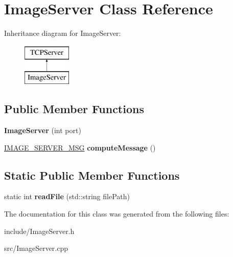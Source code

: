 \hypertarget{classImageServer}{\section{Image\-Server Class Reference}
\label{classImageServer}
}
Inheritance diagram for Image\-Server\-:\begin{figure}[H]
\begin{center}
\leavevmode
\includegraphics[height=2.000000cm]{classImageServer}
\end{center}
\end{figure}
\subsection*{Public Member Functions}
\begin{DoxyCompactItemize}
\item 
\hypertarget{classImageServer_a4b824c5337974577e55c68c3443939c6}{{\bfseries Image\-Server} (int port)}\label{classImageServer_a4b824c5337974577e55c68c3443939c6}

\item 
\hypertarget{classImageServer_ade5594050e37e16139e6707f3e8373d0}{\hyperlink{unionIMAGE__SERVER__MSG}{I\-M\-A\-G\-E\-\_\-\-S\-E\-R\-V\-E\-R\-\_\-\-M\-S\-G} {\bfseries compute\-Message} ()}\label{classImageServer_ade5594050e37e16139e6707f3e8373d0}

\end{DoxyCompactItemize}
\subsection*{Static Public Member Functions}
\begin{DoxyCompactItemize}
\item 
\hypertarget{classImageServer_a9d05ecf0fcf25972973010d5aae92cd7}{static int {\bfseries read\-File} (std\-::string file\-Path)}\label{classImageServer_a9d05ecf0fcf25972973010d5aae92cd7}

\end{DoxyCompactItemize}


The documentation for this class was generated from the following files\-:\begin{DoxyCompactItemize}
\item 
include/Image\-Server.\-h\item 
src/Image\-Server.\-cpp\end{DoxyCompactItemize}
